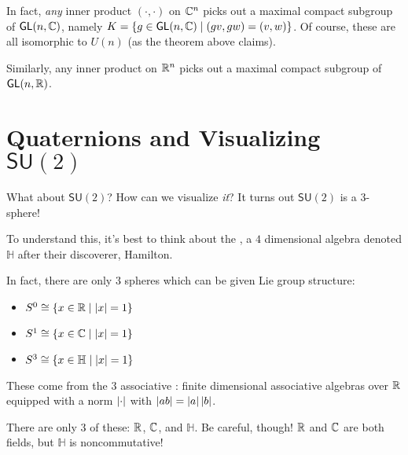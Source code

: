 \documentclass[../main.tex]{subfiles}
\begin{document}

In fact, \emph{any} inner product $(\cdot, \cdot)$ on $\mathbb{C}^n$ picks out a 
maximal compact subgroup of $\mathsf{GL}(n,\mathbb{C})$, namely 
$K = \{ g \in \mathsf{GL}(n,\mathbb{C}) \mid (gv,gw) = (v,w) \}$.
Of course, these are all isomorphic to $U(n)$ (as the theorem above claims).

Similarly, any inner product on $\mathbb{R}^n$ picks out a maximal compact subgroup of
$\mathsf{GL}(n,\mathbb{R})$.

\section{Quaternions and Visualizing $\mathsf{SU}(2)$}



What about $\mathsf{SU}(2)$? How can we visualize \emph{it}? It turns out
$\mathsf{SU}(2)$ is a $3$-sphere!

To understand this, it's best to think about the , 
a $4$ dimensional algebra denoted $\mathbb{H}$ after their discoverer, Hamilton.

In fact, there are only $3$ spheres which can be given Lie group structure:

\begin{itemize}
  \item $S^0 \cong \{ x \in \mathbb{R} \mid \left \lvert x \right \rvert = 1 \}$
  \item $S^1 \cong \{ x \in \mathbb{C} \mid \left \lvert x \right \rvert = 1 \}$
  \item $S^3 \cong \{ x \in \mathbb{H} \mid \left \lvert x \right \rvert = 1 \}$
\end{itemize}

These come from the $3$ associative :
finite dimensional associative algebras over $\mathbb{R}$ equipped with a norm $\left \lvert \cdot \right \rvert$
with $\left \lvert ab \right \rvert = \left \lvert a \right \rvert \left \lvert b \right \rvert$.

There are only $3$ of these: $\mathbb{R}$, $\mathbb{C}$, and $\mathbb{H}$. Be careful, though! 
$\mathbb{R}$ and $\mathbb{C}$ are both fields, but $\mathbb{H}$ is noncommutative!
\end{document}
